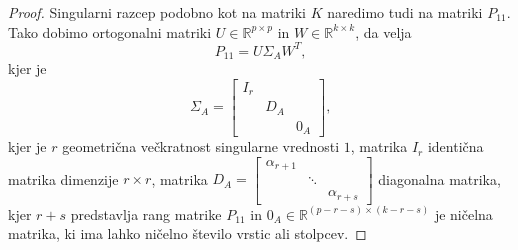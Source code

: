 \documentclass[mat1]{article}
\newcommand{\norm}[1]{\left\lVert#1\right\rVert}
\theoremstyle{definition}
\begin{document}
\begin{proof}
Singularni razcep podobno kot na matriki $K$ naredimo tudi na matriki $P_{11}$. Tako dobimo ortogonalni matriki $U \in \mathbb{R}^{p \times p}$ in $W \in \mathbb{R}^{k \times k}$, da velja $$ P_{11} = U \Sigma_A W^T \text{,}$$ kjer je $$\Sigma_A = 
\begin{bmatrix} 
I_r &  & \\
 & D_A & \\
 & & 0_A  
\end{bmatrix} \text{,}$$ kjer je $r$ geometrična večkratnost singularne vrednosti $1$, matrika $I_r$ identična matrika dimenzije $r \times r$, matrika $D_A =
\begin{bmatrix}
\alpha_{r+1} & & \\
 & \ddots & \\
 & & \alpha_{r+s}
\end{bmatrix}$ diagonalna matrika, kjer $r+s$ predstavlja rang matrike $P_{11}$ in $0_A \in \mathbb{R}^{(p-r-s) \times (k-r-s)}$ je ničelna matrika, ki ima lahko ničelno število vrstic ali stolpcev.




\end{proof}
\end{document}
